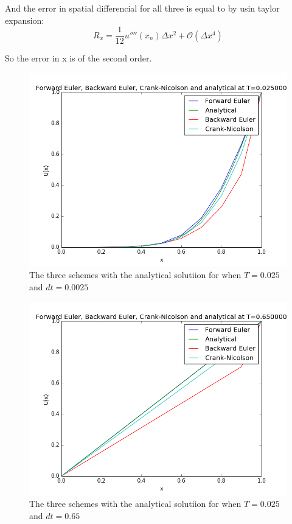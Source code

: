 \documentclass[a4paper,10pt]{article}
\begin{document}
And the error in spatial differencial for all three is equal to by usin taylor expansion:
\begin{equation}
 R_x = \frac{1}{12}u''''(x_n) \Delta x^2 + \mathcal{O}(\Delta x^4)
\end{equation}

So the error in x is of the second order.

\begin{figure}
  \includegraphics[scale=0.5]{alldt025analyticalt1}
    \caption{The three schemes with the analytical solutiion for when $T = 0.025$ and $dt = 0.0025$}
    \label{fig:NumAna0025}
\end{figure}

\begin{figure}
  \includegraphics[scale=0.5]{alldt025analyticalt2}
    \caption{The three schemes with the analytical solutiion for when $T = 0.025$ and $dt = 0.65$}
    \label{fig:NumAna065}
\end{figure}
\end{document}
